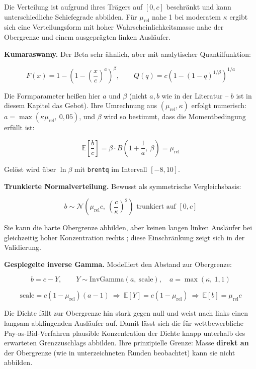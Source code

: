 \documentclass[
  a4paper,
  10pt]{article}
\begin{document}
Die Verteilung ist aufgrund ihres Trägers auf \([0,c]\) beschränkt und
kann unterschiedliche Schiefegrade abbilden. Für \(\mu_{\mathrm{rel}}\)
nahe 1 bei moderatem \(\kappa\) ergibt sich eine Verteilungsform mit
hoher Wahrscheinlichkeitsmasse nahe der Obergrenze und einem
ausgeprägten linken Ausläufer.

\textbf{Kumaraswamy.} Der Beta sehr ähnlich, aber mit analytischer
Quantilfunktion:

\[ F(x) = 1 - \left(1 - \left(\frac{x}{c}\right)^{a}\right)^{\beta}, \qquad Q(q) = c\left(1 - (1-q)^{1/\beta}\right)^{1/a} \]

Die Formparameter heißen hier \(a\) und \(\beta\) (nicht \(a, b\) wie in
der Literatur -- \(b\) ist in diesem Kapitel das Gebot). Ihre Umrechnung
aus \((\mu_{\mathrm{rel}}, \kappa)\) erfolgt numerisch:
\(a = \max(\kappa \mu_{\mathrm{rel}},\ 0{,}05)\), und \(\beta\) wird so
bestimmt, dass die Momentbedingung erfüllt ist:

\[ \mathbb{E}\left[\frac{b}{c}\right] = \beta \cdot B\left(1 + \frac{1}{a},\ \beta\right) = \mu_{\mathrm{rel}} \]

Gelöst wird über \(\ln \beta\) mit \texttt{brentq} im Intervall
\([-8, 10]\).

\textbf{Trunkierte Normalverteilung.} Bewusst als symmetrische
Vergleichsbasis:

\[ b \sim \mathcal{N}\left(\mu_{\mathrm{rel}} c,\ \left(\frac{c}{\kappa}\right)^2\right) \text{ trunkiert auf } [0, c] \]

Sie kann die harte Obergrenze abbilden, aber keinen langen linken
Ausläufer bei gleichzeitig hoher Konzentration rechts ; diese
Einschränkung zeigt sich in der Validierung.

\textbf{Gespiegelte inverse Gamma.} Modelliert den Abstand zur
Obergrenze:

\[ b = c - Y, \qquad Y \sim \mathrm{InvGamma}\left(a,\ \text{scale}\right), \quad a = \max(\kappa,\ 1{,}1) \]

\[ \text{scale} = c\left(1 - \mu_{\mathrm{rel}}\right)(a-1) \ \Longrightarrow\ \mathbb{E}[Y] = c(1-\mu_{\mathrm{rel}}) \ \Longrightarrow\ \mathbb{E}[b] = \mu_{\mathrm{rel}} c \]

Die Dichte fällt zur Obergrenze hin stark gegen null und weist nach
links einen langsam abklingenden Ausläufer auf. Damit lässt sich die für
wettbewerbliche Pay-as-Bid-Verfahren plausible Konzentration der Dichte
knapp unterhalb des erwarteten Grenzzuschlags abbilden. Ihre
prinzipielle Grenze: Masse \textbf{direkt an} der Obergrenze (wie in
unterzeichneten Runden beobachtet) kann sie nicht abbilden.
\end{document}
